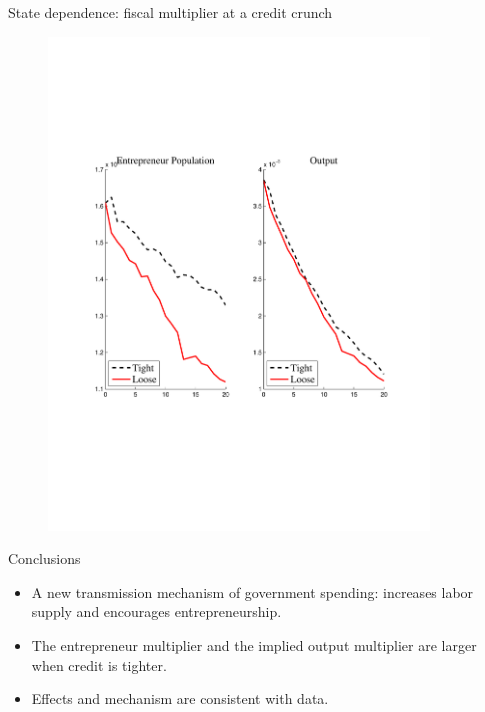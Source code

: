 \documentclass[svgnames]{beamer}
\begin{document}
\begin{frame}{State dependence: fiscal multiplier at a credit crunch}
\begin{figure}[!ht]
\includegraphics[trim=1cm 6.5cm 1cm 6.5cm, clip=true, width=0.9\textwidth]{graph/GShockResStateLambda.pdf}
\end{figure}
\end{frame}

\begin{frame}{Conclusions}
\begin{itemize}
\item A new transmission mechanism of government spending: increases labor supply and encourages entrepreneurship.
\item The entrepreneur multiplier and the implied output multiplier are larger when credit is tighter.
\item Effects and mechanism are consistent with data.
\end{itemize}
\end{frame}
\end{document}
